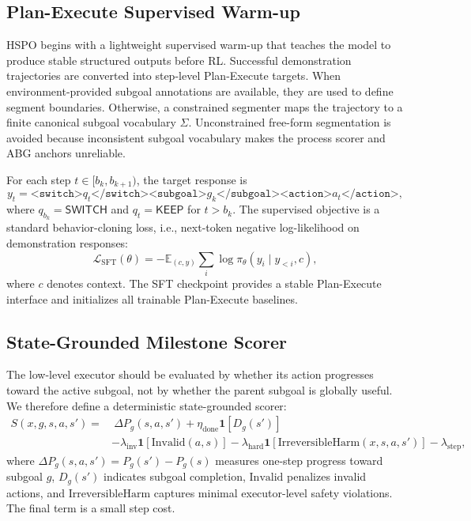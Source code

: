 \documentclass{article}
\newcommand{\wei}[1]{\textcolor{red}{#1}}
\begin{document}


\subsection{Plan-Execute Supervised Warm-up} %

HSPO begins with a lightweight supervised warm-up that teaches the model to produce stable structured outputs before RL. Successful demonstration trajectories are converted into step-level Plan-Execute targets. When environment-provided subgoal annotations are available, they are used to define segment boundaries. Otherwise, a constrained segmenter maps the trajectory to a finite canonical subgoal vocabulary $\Sigma$. Unconstrained free-form segmentation is avoided because inconsistent subgoal vocabulary makes the process scorer and ABG anchors unreliable.

For each step $t\in[b_k,b_{k+1})$, the target response is
\begin{equation}
y_t =
\texttt{<switch>}q_t\texttt{</switch>}
\texttt{<subgoal>}g_k\texttt{</subgoal>}
\texttt{<action>}a_t\texttt{</action>},
\end{equation}
where $q_{b_k}=\mathsf{SWITCH}$ and $q_t=\mathsf{KEEP}$ for $t>b_k$. The supervised objective is a standard behavior-cloning loss, i.e., next-token negative log-likelihood on demonstration responses:
\begin{equation}
\mathcal{L}_{\mathrm{SFT}}(\theta)
=
-\mathbb{E}_{(c,y)}
\sum_i
\log \pi_\theta(y_i\mid y_{<i},c),
\label{eq:sft_loss}
\end{equation}
where $c$ denotes context. The SFT checkpoint provides a stable Plan-Execute interface and initializes all trainable Plan-Execute baselines.


\subsection{State-Grounded Milestone Scorer} %
The low-level executor should be evaluated by whether its action progresses toward the active subgoal, not by whether the parent subgoal is globally useful. We therefore define a deterministic state-grounded scorer:
\begin{equation}
\begin{aligned}
S(x,g,s,a,s')
=
&\ \Delta P_g(s,a,s')
+ \eta_{\mathrm{done}}\mathbf{1}[D_g(s')]  \\
&-\lambda_{\mathrm{inv}}\mathbf{1}[\mathrm{Invalid}(a,s)]
-\lambda_{\mathrm{hard}}\mathbf{1}[\mathrm{IrreversibleHarm}(x,s,a,s')]
-\lambda_{\mathrm{step}},
\end{aligned}
\label{eq:scorer}
\end{equation}
where $\Delta P_g(s,a,s')=P_g(s')-P_g(s)$ measures one-step progress toward subgoal $g$, $D_g(s')$ indicates subgoal completion, $\mathrm{Invalid}$ penalizes invalid actions, and $\mathrm{IrreversibleHarm}$ captures minimal executor-level safety violations. The final term is a small step cost.
\end{document}
